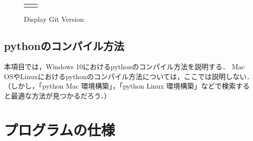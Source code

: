 \begin{figure}[h]
\begin{tabular}{cc}
\begin{minipage}{.5\textwidth}
          \caption{Display Git Version}
          \label{fig:git_version} %
      \end{minipage}
  \end{tabular}
\end{figure}




\subsection{pythonのコンパイル方法}
本項目では，Windows 10におけるpythonのコンパイル方法を説明する．
Mac OSやLinuxにおけるpythonのコンパイル方法については，ここでは説明しない．
（しかし，「python Mac 環境構築」，「python Linux 環境構築」などで検索すると最適な方法が見つかるだろう．）

\section{プログラムの仕様}

